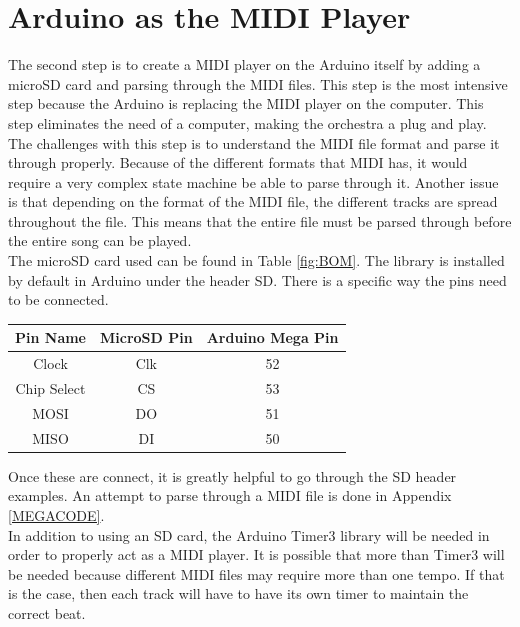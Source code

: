 \documentclass[11pt, a4paper]{report}
\begin{document}
\section{Arduino as the MIDI Player}

The second step is to create a MIDI player on the Arduino itself by adding a microSD card and parsing through the MIDI files. This step is the most intensive step because the Arduino is replacing the MIDI player on the computer. This step eliminates the need of a computer, making the orchestra a plug and play. \\

The challenges with this step is to understand the MIDI file format and parse it through properly. Because of the different formats that MIDI has, it would require a very complex state machine be able to parse through it. Another issue is that depending on the format of the MIDI file, the different tracks are spread throughout the file. This means that the entire file must be parsed through before the entire song can be played. \\

The microSD card used can be found in Table \ref{fig:BOM}. The library is installed by default in Arduino under the header SD. There is a specific way the pins need to be connected. 

\begin{center}
 \begin{tabular}{||c | c | c ||} 
 \hline
    Pin Name & MicroSD Pin & Arduino Mega Pin\\
 \hline
    Clock & Clk   & 52 \\
 \hline
    Chip Select & CS & 53 \\
 \hline 
    MOSI    & DO & 51 \\
 \hline
    MISO & DI & 50\\
    \hline
\end{tabular}
\end{center}

Once these are connect, it is greatly helpful to go through the SD header examples. An attempt to parse through a MIDI file is done in Appendix \ref{MEGACODE}.\\

In addition to using an SD card, the Arduino Timer3 library will be needed in order to properly act as a MIDI player. It is possible that more than Timer3 will be needed because different MIDI files may require more than one tempo. If that is the case, then each track will have to have its own timer to maintain the correct beat. \\
\end{document}

